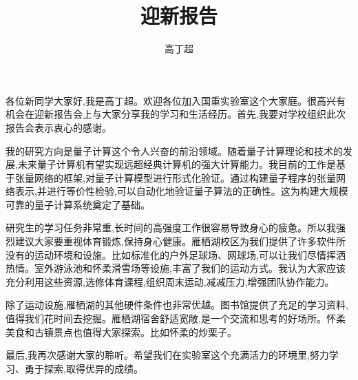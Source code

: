 \documentclass[18 pt]{article}
\title{迎新报告}
\author{高丁超}
\begin{document}
	\maketitle
	
	
	各位新同学大家好,我是高丁超。欢迎各位加入国重实验室这个大家庭。很高兴有机会在迎新报告会上与大家分享我的学习和生活经历。首先,我要对学校组织此次报告会表示衷心的感谢。
	
	我的研究方向是量子计算这个令人兴奋的前沿领域。随着量子计算理论和技术的发展,未来量子计算机有望实现远超经典计算机的强大计算能力。我目前的工作是基于张量网络的框架,对量子计算模型进行形式化验证。通过构建量子程序的张量网络表示,并进行等价性检验,可以自动化地验证量子算法的正确性。这为构建大规模可靠的量子计算系统奠定了基础。
	
	研究生的学习任务非常重,长时间的高强度工作很容易导致身心的疲惫。所以我强烈建议大家要重视体育锻炼,保持身心健康。雁栖湖校区为我们提供了许多软件所没有的运动环境和设施。比如标准化的户外足球场、网球场,可以让我们尽情挥洒热情。室外游泳池和怀柔滑雪场等设施,丰富了我们的运动方式。我认为大家应该充分利用这些资源,选修体育课程,组织周末运动,减减压力,增强团队协作能力。
	
	除了运动设施,雁栖湖的其他硬件条件也非常优越。图书馆提供了充足的学习资料,值得我们花时间去挖掘。雁栖湖宿舍舒适宽敞,是一个交流和思考的好场所。怀柔美食和古镇景点也值得大家探索。比如怀柔的炒栗子。
	
	
	最后,我再次感谢大家的聆听。希望我们在实验室这个充满活力的环境里,努力学习、勇于探索,取得优异的成绩。
\end{document}
